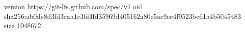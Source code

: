 version https://git-lfs.github.com/spec/v1
oid sha256:ab0de8d3fd3caa1c36f4fd35969d405162a80e5ac9ec4f9523bc61a4b5045483
size 1048672
